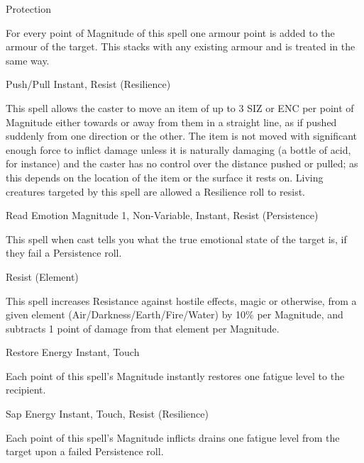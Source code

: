 \begin{rpg-spell}
{Protection}
{}

For every point of Magnitude of this spell one armour point is added to the armour of the target. This stacks with any existing armour and is treated in the same way. 
\end{rpg-spell}


\begin{rpg-spell}
{Push/Pull}
{Instant, Resist (Resilience)}

This spell allows the caster to move an item of up to 3 SIZ or ENC per point of Magnitude either towards or away from them in a straight line, as if pushed suddenly from one direction or the other. The item is not moved with significant enough force to inflict damage unless it is naturally damaging (a bottle of acid, for instance) and the caster has no control over the distance pushed or pulled; as this depends on the location of the item or the surface it rests on. Living creatures targeted by this spell are allowed a Resilience roll to resist.
\end{rpg-spell}


\begin{rpg-spell}
{Read Emotion}
{Magnitude 1, Non-Variable, Instant, Resist (Persistence)}

This spell when cast tells you what the true emotional state of the target is, if they fail a Persistence roll.
\end{rpg-spell}


\begin{rpg-spell}
{Resist (Element)}
\nopagebreak
{}

This spell increases Resistance against hostile effects, magic or otherwise, from a given element (Air/Darkness/Earth/Fire/Water) by 10\% per Magnitude, and subtracts 1 point of damage from that element per Magnitude.
\end{rpg-spell}


\begin{rpg-spell}
{Restore Energy}
{Instant, Touch}

Each point of this spell’s Magnitude instantly restores one fatigue level to the recipient.
\end{rpg-spell}


\begin{rpg-spell}
{Sap Energy}
{Instant, Touch, Resist (Resilience)}

Each point of this spell’s Magnitude inflicts drains one fatigue level from the target upon a failed Persistence roll.
\end{rpg-spell}


